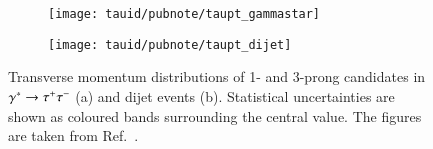 \begin{figure}[htbp]
  \begin{subfigure}{0.498\textwidth}
    \texttt{[image: tauid/pubnote/taupt\_gammastar]}
    \label{fig:tauid_candidate_pt_gammastar}
  \end{subfigure}\hfill%
  \begin{subfigure}{0.498\textwidth}
    \texttt{[image: tauid/pubnote/taupt\_dijet]}
    \label{fig:tauid_candidate_pt_dijet}
  \end{subfigure}

  \caption[Transverse momentum distribution of \tauhadvis candidates in
  $\gammastar \to \tautau$ and dijet events.]{Transverse momentum distributions
    of 1- and 3-prong \tauhadvis candidates in $\gammastar \to \tautau$ (a) and
    dijet events (b). Statistical uncertainties are shown as coloured bands
    surrounding the central value. The figures are taken from
    Ref.~\cite{ATL-PHYS-PUB-2019-033}.}%
  \label{fig:tauid_candidate_pt}
\end{figure}


